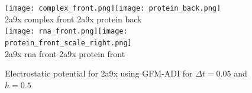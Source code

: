 
\begin{figure}[!ht]
	\begin{center}
		\texttt{[image: complex\_front.png]}\texttt{[image: protein\_back.png]}\\
		\hskip 0.5in 2a9x complex front\hskip 2.5in 2a9x  protein back\\
		\texttt{[image: rna\_front.png]}\texttt{[image: protein\_front\_scale\_right.png]}\\
		\hskip 0.7in 2a9x rna front\hskip 2.8in 2a9x  protein front\\
		\caption{Electrostatic potential for 2a9x using GFM-ADI for $\Delta t = 0.05$ and $h = 0.5$}
	\end{center}
\end{figure}

